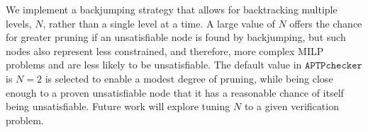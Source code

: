 \documentclass[oneside,11pt,dvipsnames]{book}
\newcommand{\nnproofchecker}{\texttt{APTPchecker}}
\begin{document}
We implement a backjumping strategy that allows for backtracking multiple levels, $N$, rather than a single level at a time.
A large value of $N$ offers the chance for greater pruning if an unsatisfiable node is found by
backjumping, but such nodes also represent less constrained, and therefore, more complex MILP problems
and are less likely to be unsatisfiable.
The default value in $\nnproofchecker{}$ is $N=2$ is selected to enable a modest degree of pruning,
while being close enough to a proven unsatisfiable node that it has a reasonable chance of itself being unsatisfiable.
Future work will explore tuning $N$ to a given verification problem.




\end{document}
